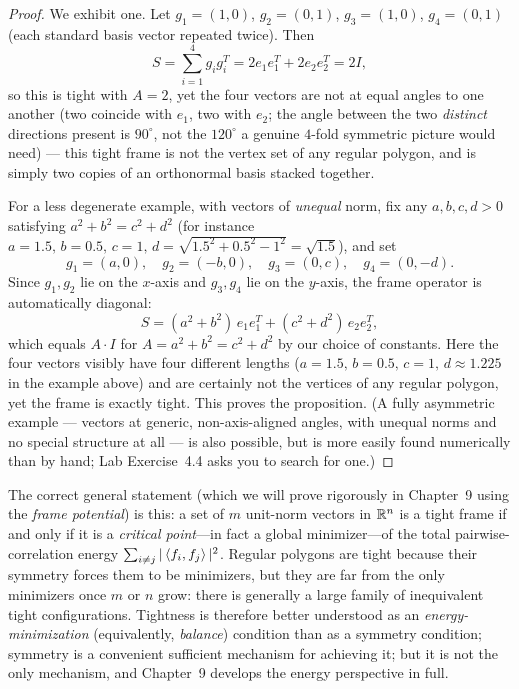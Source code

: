 \begin{proof}
We exhibit one. Let $g_1=(1,0)$, $g_2=(0,1)$, $g_3=(1,0)$, $g_4=(0,1)$
(each standard basis vector repeated twice). Then
\[
  S = \sum_{i=1}^4 g_ig_i^T = 2e_1e_1^T + 2e_2e_2^T = 2I,
\]
so this is tight with $A=2$, yet the four vectors are not at equal
angles to one another (two coincide with $e_1$, two with $e_2$; the
angle between the two \emph{distinct} directions present is $90^\circ$,
not the $120^\circ$ a genuine $4$-fold symmetric picture would need) ---
this tight frame is not the vertex set of any regular polygon, and is
simply two copies of an orthonormal basis stacked together.

For a less degenerate example, with vectors of \emph{unequal} norm, fix
any $a, b, c, d > 0$ satisfying $a^2+b^2 = c^2+d^2$ (for instance
$a=1.5,\,b=0.5,\,c=1,\,d=\sqrt{1.5^2+0.5^2-1^2}=\sqrt{1.5}$), and set
\[
  g_1 = (a, 0), \quad g_2 = (-b, 0), \quad g_3 = (0, c), \quad g_4 = (0, -d).
\]
Since $g_1, g_2$ lie on the $x$-axis and $g_3, g_4$ lie on the $y$-axis,
the frame operator is automatically diagonal:
\[
  S = (a^2+b^2)\,e_1e_1^T + (c^2+d^2)\,e_2e_2^T,
\]
which equals $A\cdot I$ for $A = a^2+b^2 = c^2+d^2$ by our choice of
constants. Here the four vectors visibly have four different lengths
($a=1.5,\,b=0.5,\,c=1,\,d\approx1.225$ in the example above) and are
certainly not the vertices of any regular polygon, yet the frame is
exactly tight. This proves the proposition. (A fully asymmetric example
--- vectors at generic, non-axis-aligned angles, with unequal norms and
no special structure at all --- is also possible, but is more easily
found numerically than by hand; Lab Exercise~4.4 asks you to search for
one.)
\end{proof}

\begin{remark*}
The correct general statement (which we will prove rigorously in
Chapter~9 using the \emph{frame potential}) is this: a set of $m$
unit-norm vectors in $\mathbb{R}^n$ is a tight frame if and only if it is a
\emph{critical point}---in fact a global minimizer---of the total
pairwise-correlation energy $\sum_{i\ne j}|\left\langle f_i, f_j \right\rangle|^2$. Regular
polygons are tight because their symmetry forces them to be minimizers,
but they are far from the only minimizers once $m$ or $n$ grow: there is
generally a large family of inequivalent tight configurations. Tightness
is therefore better understood as an \emph{energy-minimization}
(equivalently, \emph{balance}) condition than as a symmetry condition;
symmetry is a convenient sufficient mechanism for achieving it; but it is
not the only mechanism, and Chapter~9 develops the energy perspective in
full.
\end{remark*}

